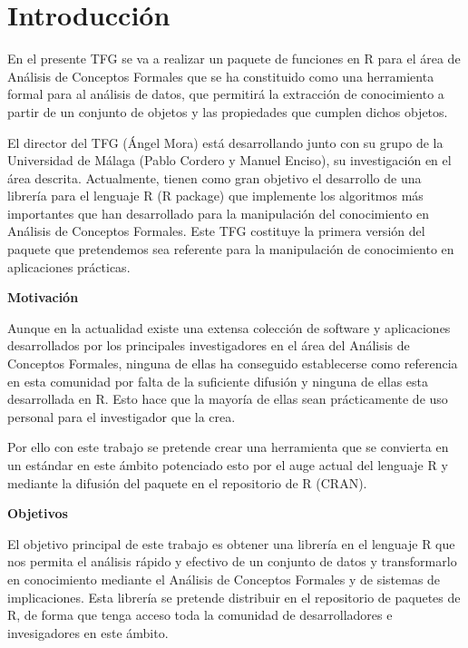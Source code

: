 \section{Introducci\'on}

En el presente TFG se va a realizar un paquete de funciones en R para el \'area de An\'alisis de Conceptos Formales que se ha constituido como una herramienta formal para al an\'alisis de datos, que permitir\'a la extracci\'on de conocimiento a partir de un conjunto de objetos y las propiedades que cumplen dichos objetos.

El director del TFG (\'Angel Mora) est\'a desarrollando junto con su grupo de la Universidad de M\'alaga (Pablo Cordero y Manuel Enciso), su investigaci\'on en el \'area descrita. Actualmente, tienen como gran objetivo el desarrollo de una librer\'ia para el lenguaje R (R package) que implemente los algoritmos m\'as importantes que han desarrollado para la manipulaci\'on del conocimiento en  An\'alisis de Conceptos Formales. Este TFG costituye la primera versi\'on del paquete que pretendemos sea referente para la manipulaci\'on de conocimiento en aplicaciones pr\'acticas.

\textbf{Motivaci\'on}

Aunque en la actualidad existe una extensa colecci\'on de software y aplicaciones desarrollados por los principales investigadores en el \'area del  An\'alisis de Conceptos Formales, ninguna de ellas ha conseguido establecerse como referencia en esta comunidad por falta de la suficiente difusi\'on y ninguna de ellas esta desarrollada en R. Esto hace que la mayor\'ia de ellas sean pr\'acticamente de uso personal para el investigador que la crea. 

Por ello con este trabajo se pretende crear una herramienta que se convierta en un est\'andar en este \'ambito potenciado esto por el auge actual del lenguaje R y mediante la difusi\'on del paquete en el repositorio de R (CRAN).


\textbf{Objetivos}

El objetivo principal de este trabajo es obtener una librer\'ia en el lenguaje R que nos permita el an\'alisis r\'apido y efectivo de un conjunto de datos y transformarlo en conocimiento mediante el An\'alisis de Conceptos Formales y de sistemas de implicaciones. Esta librer\'ia se pretende distribuir en el repositorio de paquetes de R, de forma que tenga acceso toda la comunidad de desarrolladores e invesigadores en este \'ambito.

\newpage